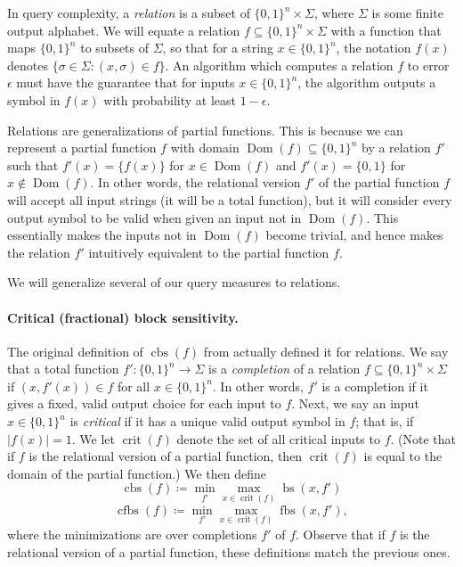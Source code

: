 \documentclass[10pt,a4paper]{article}
\theoremstyle{definition}
\DeclareMathOperator{\Dom}{Dom}
\newcommand{\B}{\{0,1\}}
\renewcommand{\>}{\rangle}
\newcommand{\<}{\langle}
\DeclareMathOperator{\bs}{bs}
\DeclareMathOperator{\fbs}{fbs}
\DeclareMathOperator{\cbs}{cbs}
\DeclareMathOperator{\cfbs}{cfbs}
\DeclareMathOperator{\crit}{crit}
\begin{document}
In query complexity, a \emph{relation} is a subset
of $\B^n\times \Sigma$, where $\Sigma$ is some finite
output alphabet. We will equate a relation
$f\subseteq \B^n\times\Sigma$ with a function
that maps $\B^n$ to subsets of $\Sigma$, so that
for a string $x\in\B^n$, the notation $f(x)$ denotes
$\{\sigma\in\Sigma:(x,\sigma)\in f\}$.
An algorithm which computes a relation $f$ to error
$\epsilon$ must have the guarantee that for inputs $x\in\B^n$,
the algorithm outputs a symbol in $f(x)$ with probability
at least $1-\epsilon$.

Relations are generalizations of partial functions.
This is because we can represent a partial function
$f$ with domain $\Dom(f)\subseteq\B^n$ by a relation
$f'$ such that $f'(x)=\{f(x)\}$ for $x\in\Dom(f)$
and $f'(x)=\{0,1\}$ for $x\notin\Dom(f)$. In other words,
the relational version $f'$ of the partial function $f$
will accept all input strings (it will be a total function),
but it will consider every output symbol to be valid
when given an input not in $\Dom(f)$. This essentially
makes the inputs not in $\Dom(f)$ become trivial, and hence
makes the relation $f'$ intuitively equivalent to the partial
function $f$.

We will generalize several of our query measures to relations.

\paragraph{Critical (fractional) block sensitivity.}
The original definition of $\cbs(f)$ from \cite{HN12} actually
defined it for relations.
We say that a total function $f'\colon\B^n\to\Sigma$
is a \emph{completion} of a relation $f\subseteq \B^n\times\Sigma$
if $(x,f'(x))\in f$ for all $x\in\B^n$. In other words,
$f'$ is a completion if it gives a fixed, valid
output choice for each input to $f$. Next, we say an input
$x\in\B^n$ is \emph{critical} if it has a unique valid
output symbol in $f$; that is, if $|f(x)|=1$.
We let $\crit(f)$ denote the set of all critical inputs
to $f$.
(Note that if $f$ is the relational version of a partial function,
then $\crit(f)$ is equal to the domain of the partial function.)
We then define
\[\cbs(f)\coloneqq \min_{f'}\max_{x\in\crit(f)}\bs(x,f')\]
\[\cfbs(f)\coloneqq \min_{f'}\max_{x\in\crit(f)}\fbs(x,f'),\]
where the minimizations are over completions $f'$ of $f$.
Observe that if $f$ is the relational version
of a partial function, these definitions
match the previous ones.
\end{document}
